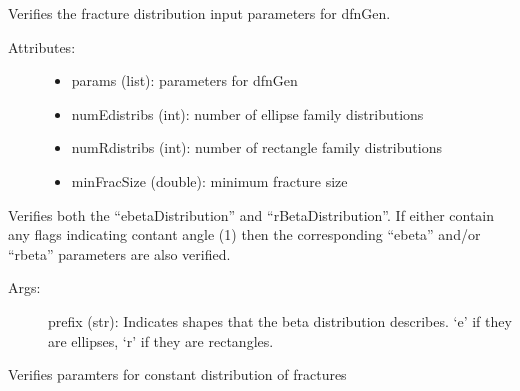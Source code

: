 \documentclass[letterpaper,10pt,english]{sphinxmanual}
\begin{document}
\begin{fulllineitems}
\label{pydfnworks:pydfnworks.distributions.distr}
Verifies the fracture distribution input parameters for dfnGen.
\begin{description}
\item[{Attributes:}] \leavevmode\begin{itemize}
\item {} 
params (list): parameters for dfnGen

\item {} 
numEdistribs (int): number of ellipse family distributions

\item {} 
numRdistribs (int): number of rectangle family distributions

\item {} 
minFracSize (double): minimum fracture size

\end{itemize}

\end{description}

\begin{fulllineitems}
\label{pydfnworks:pydfnworks.distributions.distr.beta_distribution}
Verifies both the ``ebetaDistribution'' and ``rBetaDistribution''. If either contain any flags
indicating contant angle (1) then the corresponding ``ebeta'' and/or ``rbeta'' parameters are 
also verified.
\begin{description}
\item[{Args:}] \leavevmode
prefix (str): Indicates shapes that the beta distribution describes. `e' if they are ellipses, `r' if they are rectangles.

\end{description}

\end{fulllineitems}


\begin{fulllineitems}
\label{pydfnworks:pydfnworks.distributions.distr.constant_dist}
Verifies paramters for constant distribution of fractures


\end{fulllineitems}
\end{fulllineitems}
\end{document}
